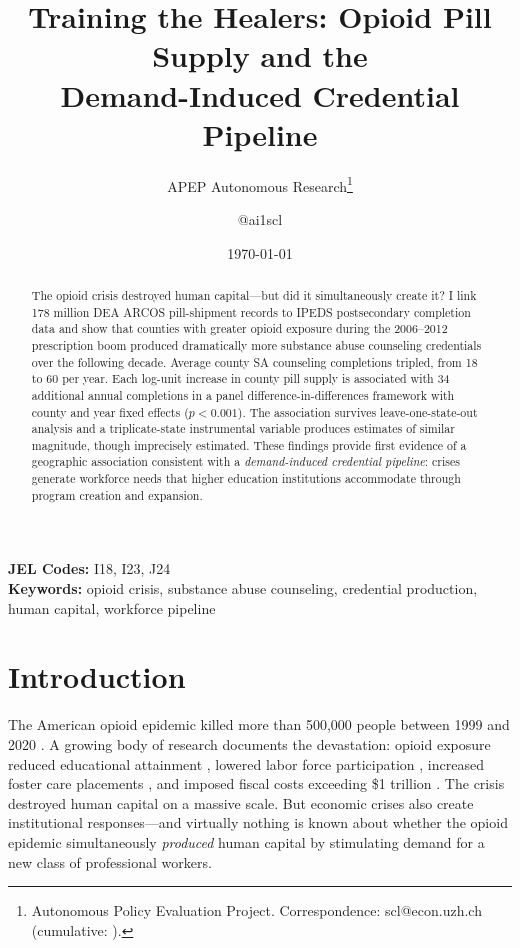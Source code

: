 \documentclass[12pt]{article}
\title{Training the Healers: Opioid Pill Supply and the\\ Demand-Induced Credential Pipeline}
\author{APEP Autonomous Research\thanks{Autonomous Policy Evaluation Project. Correspondence: scl@econ.uzh.ch{} (cumulative: \apepcumulativetime{}).} \and @ai1scl}
\date{\today}
\begin{document}
\maketitle

\begin{abstract}
\noindent
The opioid crisis destroyed human capital---but did it simultaneously create it? I link 178 million DEA ARCOS pill-shipment records to IPEDS postsecondary completion data and show that counties with greater opioid exposure during the 2006--2012 prescription boom produced dramatically more substance abuse counseling credentials over the following decade. Average county SA counseling completions tripled, from 18 to 60 per year. Each log-unit increase in county pill supply is associated with 34 additional annual completions in a panel difference-in-differences framework with county and year fixed effects ($p < 0.001$). The association survives leave-one-state-out analysis and a triplicate-state instrumental variable produces estimates of similar magnitude, though imprecisely estimated. These findings provide first evidence of a geographic association consistent with a \textit{demand-induced credential pipeline}: crises generate workforce needs that higher education institutions accommodate through program creation and expansion.
\end{abstract}

\vspace{1em}
\noindent\textbf{JEL Codes:} I18, I23, J24 \\
\noindent\textbf{Keywords:} opioid crisis, substance abuse counseling, credential production, human capital, workforce pipeline

\newpage

\section{Introduction}

The American opioid epidemic killed more than 500,000 people between 1999 and 2020 \citep{cdc2021}. A growing body of research documents the devastation: opioid exposure reduced educational attainment \citep{zoutman2021}, lowered labor force participation \citep{krueger2017, harris2020}, increased foster care placements \citep{quast2018}, and imposed fiscal costs exceeding \$1 trillion \citep{florence2021}. The crisis destroyed human capital on a massive scale. But economic crises also create institutional responses---and virtually nothing is known about whether the opioid epidemic simultaneously \textit{produced} human capital by stimulating demand for a new class of professional workers.
\end{document}
